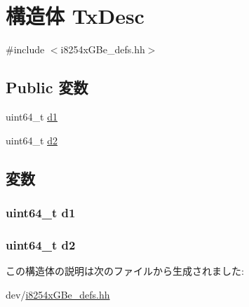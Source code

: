 \hypertarget{structiGbReg_1_1TxDesc}{
\section{構造体 TxDesc}
\label{structiGbReg_1_1TxDesc}
}


{\ttfamily \#include $<$i8254xGBe\_\-defs.hh$>$}\subsection*{Public 変数}
\begin{DoxyCompactItemize}
\item 
uint64\_\-t \hyperlink{structiGbReg_1_1TxDesc_acf7fdcf693e16061288fb38f25c65065}{d1}
\item 
uint64\_\-t \hyperlink{structiGbReg_1_1TxDesc_af70722427656749b5aaa2c67a7ccc33d}{d2}
\end{DoxyCompactItemize}


\subsection{変数}
\hypertarget{structiGbReg_1_1TxDesc_acf7fdcf693e16061288fb38f25c65065}{
\subsubsection[{d1}]{\setlength{\rightskip}{0pt plus 5cm}uint64\_\-t {\bf d1}}}
\label{structiGbReg_1_1TxDesc_acf7fdcf693e16061288fb38f25c65065}
\hypertarget{structiGbReg_1_1TxDesc_af70722427656749b5aaa2c67a7ccc33d}{
\subsubsection[{d2}]{\setlength{\rightskip}{0pt plus 5cm}uint64\_\-t {\bf d2}}}
\label{structiGbReg_1_1TxDesc_af70722427656749b5aaa2c67a7ccc33d}


この構造体の説明は次のファイルから生成されました:\begin{DoxyCompactItemize}
\item 
dev/\hyperlink{i8254xGBe__defs_8hh}{i8254xGBe\_\-defs.hh}\end{DoxyCompactItemize}
